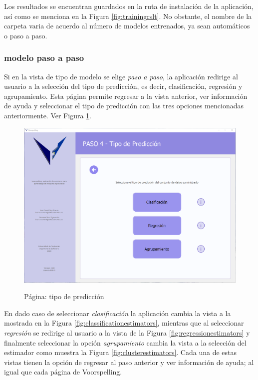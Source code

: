 Los resultados se encuentran guardados en la ruta de instalación de la aplicación, así como se menciona en la Figura \ref{fig:trainingrslt}. No obstante, el nombre de la carpeta varia de acuerdo al número de modelos entrenados, ya sean automáticos o paso a paso.

\subsubsection{modelo paso a paso}

Si en la vista de tipo de modelo se elige \textit{paso a paso}, la aplicación redirige al usuario a la selección del tipo de predicción, es decir, clasificación, regresión y agrupamiento. Esta página permite regresar a la vista anterior, ver información de ayuda y seleccionar el tipo de predicción con las tres opciones mencionadas anteriormente. Ver Figura \ref{fig:predictiontype}.

\begin{figure}[H]
    \centering
    \caption{Página: tipo de predicción}
    \includegraphics[width=\textwidth]{views/prediction_type.png}
    \label{fig:predictiontype}
\end{figure}

En dado caso de seleccionar \textit{clasificación} la aplicación cambia la vista a la mostrada en la Figura \ref{fig:classificationestimators}, mientras que al seleccionar \textit{regresión} se redirige al usuario a la vista de la Figura \ref{fig:regressionestimators} y finalmente seleccionar la opción \textit{agrupamiento} cambia la vista a la selección del estimador como muestra la Figura \ref{fig:clusterestimators}. Cada una de estas vistas tienen la opción de regresar al paso anterior y ver información de ayuda; al igual que cada página de Voorspelling.

